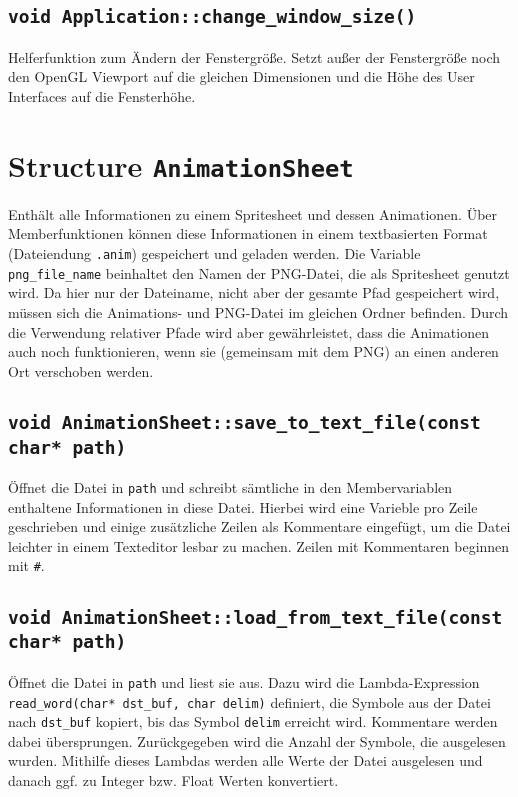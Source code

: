 \section{\lstinline{void Application::change_window_size()}}
Helferfunktion zum Ändern der Fenstergröße. Setzt außer der Fenstergröße noch den OpenGL Viewport auf die gleichen Dimensionen und die Höhe des User Interfaces auf die Fensterhöhe.



\chapter{Structure \lstinline{AnimationSheet}}
Enthält alle Informationen zu einem Spritesheet und dessen Animationen. Über Memberfunktionen können diese Informationen in einem textbasierten Format (Dateiendung \lstinline{.anim}) gespeichert und geladen werden. Die Variable \lstinline{png_file_name} beinhaltet den Namen der PNG-Datei, die als Spritesheet genutzt wird. Da hier nur der Dateiname, nicht aber der gesamte Pfad gespeichert wird, müssen sich die Animations- und PNG-Datei im gleichen Ordner befinden. Durch die Verwendung relativer Pfade wird aber gewährleistet, dass die Animationen auch noch funktionieren, wenn sie (gemeinsam mit dem PNG) an einen anderen Ort verschoben werden.

\section{\lstinline{void AnimationSheet::save_to_text_file(const char* path)}}
Öffnet die Datei in \lstinline{path} und schreibt sämtliche in den Membervariablen enthaltene Informationen in diese Datei. Hierbei wird eine Varieble pro Zeile geschrieben und einige zusätzliche Zeilen als Kommentare eingefügt, um die Datei leichter in einem Texteditor lesbar zu machen. Zeilen mit Kommentaren beginnen mit \lstinline{#}. 

\section{\lstinline{void AnimationSheet::load_from_text_file(const char* path)}}
Öffnet die Datei in \lstinline{path} und liest sie aus. Dazu wird die Lambda-Expression \lstinline{read_word(char* dst_buf, char delim)} definiert, die Symbole aus der Datei nach \lstinline{dst_buf} kopiert, bis das Symbol \lstinline{delim} erreicht wird. Kommentare werden dabei übersprungen. Zurückgegeben wird die Anzahl der Symbole, die ausgelesen wurden. Mithilfe dieses Lambdas werden alle Werte der Datei ausgelesen und danach ggf. zu Integer bzw. Float Werten konvertiert.

